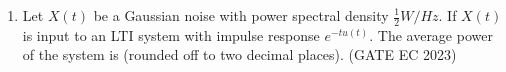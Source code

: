 \begin{enumerate}[label=\thechapter.\arabic*,ref=\thechapter.\theenumi]
\item Let $X(t)$ be a Gaussian noise with power spectral density $\frac{1}{2} W/Hz$. If $X(t)$ is input to an LTI system with impulse response $e^{-tu(t)}$. The average power of the system is (rounded off to two decimal places).
\hfill(GATE EC 2023)\\

\end{enumerate}
